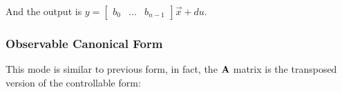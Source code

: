 \par\vspace{.5em}\noindent{}
And the output is
\(
	y =
	\begin{bmatrix}
		b_0 & \dots & b_{n-1}
	\end{bmatrix}
	\vec{x}
	+ d u
	.
\)

\subsubsection{Observable Canonical Form}

This mode is similar to previous form, in fact, the \(\bm{\mathrm{A}}\) matrix is the transposed version of the controllable form:

